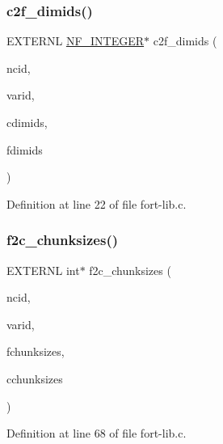 \subsubsection{\texorpdfstring{c2f\+\_\+dimids()}{c2f\_dimids()}}
{\footnotesize\ttfamily E\+X\+T\+E\+R\+NL \hyperlink{ncfortran_8h_a0fd3f9e9fc30661142a1fb549af678e7}{N\+F\+\_\+\+I\+N\+T\+E\+G\+ER}$\ast$ c2f\+\_\+dimids (\begin{DoxyParamCaption}\item[{int}]{ncid,  }\item[{int}]{varid,  }\item[{const int $\ast$}]{cdimids,  }\item[{\hyperlink{ncfortran_8h_a0fd3f9e9fc30661142a1fb549af678e7}{N\+F\+\_\+\+I\+N\+T\+E\+G\+ER} $\ast$}]{fdimids }\end{DoxyParamCaption})}



Definition at line 22 of file fort-\/lib.\+c.

\mbox{\label{fort-lib_8h_a2e587a74634daa53e8e5b12772243db8}} 
\subsubsection{\texorpdfstring{f2c\+\_\+chunksizes()}{f2c\_chunksizes()}}
{\footnotesize\ttfamily E\+X\+T\+E\+R\+NL int$\ast$ f2c\+\_\+chunksizes (\begin{DoxyParamCaption}\item[{int}]{ncid,  }\item[{int}]{varid,  }\item[{const \hyperlink{ncfortran_8h_a0fd3f9e9fc30661142a1fb549af678e7}{N\+F\+\_\+\+I\+N\+T\+E\+G\+ER} $\ast$}]{fchunksizes,  }\item[{int $\ast$}]{cchunksizes }\end{DoxyParamCaption})}



Definition at line 68 of file fort-\/lib.\+c.

\mbox{\label{fort-lib_8h_a8fc727da700ba3125fbeffcddc55a44d}} 
